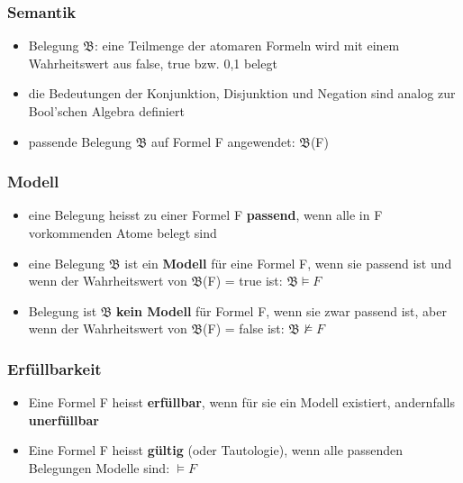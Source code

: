 \documentclass[a4paper,10pt]{article}
\newcommand{\Bold}[1]{\textbf{#1}} %
\begin{document}
\subsubsection{Semantik}
		\begin{itemize}
				\item Belegung $\mathfrak{B}$: eine Teilmenge der atomaren Formeln wird mit einem Wahrheitswert aus {false, true} bzw. {0,1} belegt
				\item die Bedeutungen der Konjunktion, Disjunktion und Negation sind analog zur Bool'schen Algebra definiert
				\item passende Belegung $\mathfrak{B}$ auf Formel F angewendet: $\mathfrak{B}$(F)
		\end{itemize}
		
\subsubsection{Modell}
		\begin{itemize}
			\item eine Belegung heisst zu einer Formel F \Bold {passend}, wenn alle in F
vorkommenden Atome belegt sind
			\item eine Belegung $\mathfrak{B}$ ist ein \Bold {Modell} f\"ur eine Formel F, wenn sie passend ist
und wenn der Wahrheitswert von $\mathfrak{B}$(F) = true ist: $\mathfrak{B} \models F$
			\item Belegung ist $\mathfrak{B}$ \Bold {kein Modell} f\"ur Formel F, wenn sie zwar passend ist,
aber wenn der Wahrheitswert von $\mathfrak{B}$(F) = false ist: $\mathfrak{B} \nvDash F$
		\end{itemize}
		
\subsubsection{Erf\"ullbarkeit}
\begin{itemize}
	\item Eine Formel F heisst \Bold {erf\"ullbar}, wenn f\"ur sie ein Modell existiert, andernfalls \Bold {unerf\"ullbar}
	\item Eine Formel F heisst \Bold {g\"ultig} (oder Tautologie), wenn alle passenden Belegungen Modelle sind: $ \models F$
\end{itemize}
\end{document}
